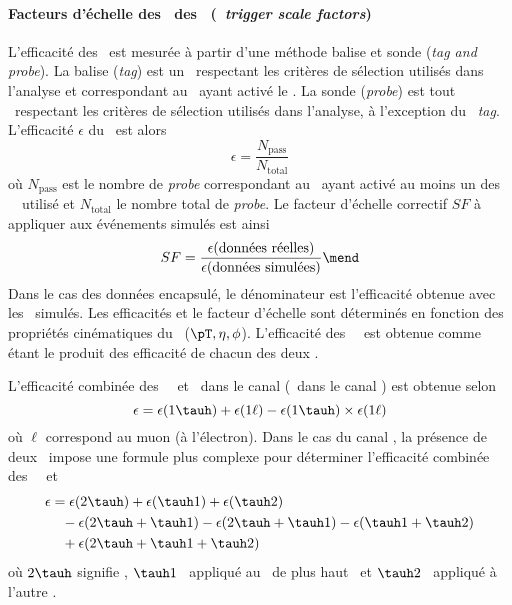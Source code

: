 \paragraph{Facteurs d'échelle des \HLTpaths\ des \tauh\ (\emph{\tauh\ trigger scale factors})}
L'efficacité des \HLTpaths\ est mesurée à partir d'une méthode \og balise et sonde \fg{}  (\emph{tag and probe}).
La balise (\emph{tag}) est un \tauh\ respectant les critères de sélection utilisés dans l'analyse et correspondant au \tauh\ ayant activé le \HLTpath.
La sonde (\emph{probe}) est tout \tauh\ respectant les critères de sélection utilisés dans l'analyse, à l'exception du \tauh\ \emph{tag}.
L'efficacité $\epsilon$ du \HLTpath\ est alors
\begin{equation}
\epsilon = \frac{N_\text{pass}}{N_\text{total}}
\end{equation}
où
$N_\text{pass}$ est le nombre de \emph{probe} correspondant au \tauh\ ayant activé au moins un des \HLTpaths\ \HLTSingleTau\ utilisé
et
$N_\text{total}$ le nombre total de \emph{probe}.
Le facteur d'échelle correctif $SF$ à appliquer aux événements simulés est ainsi
\begin{equation}
SF = \frac{\epsilon(\text{données réelles})}{\epsilon(\text{données simulées})}
\mend
\end{equation}
Dans le cas des données encapsulé, le dénominateur est l'efficacité obtenue avec les \tauh\ simulés.
Les efficacités et le facteur d'échelle sont déterminés en fonction des propriétés cinématiques du \tauh\ ($\pT, \eta, \phi$).
L'efficacité des \HLTpaths\ \HLTDoubleTau\ est obtenue comme étant le produit des efficacité de chacun des deux \tauh.
\par
L'efficacité combinée des \HLTpaths\ \HLTSingleTau\ et \HLTSingleMu\ dans le canal \mu\tauh (\HLTSingleEle\ dans le canal \ele\tauh) est obtenue selon
\begin{equation}
\epsilon = \epsilon(1\tauh) + \epsilon(1\ell) - \epsilon(1\tauh) \times \epsilon(1\ell)
\end{equation}
où $\ell$ correspond au muon (à l'électron).
Dans le cas du canal \tauh\tauh, la présence de deux \tauh\ impose une formule plus complexe pour déterminer l'efficacité combinée des \HLTpaths\ \HLTSingleTau\ et \HLTDoubleTau\,
\begin{align}
\epsilon &= \epsilon(2\tauh) + \epsilon(\tauh1) + \epsilon(\tauh2)
\nonumber\\ & \hphantom{=}
- \epsilon(2\tauh + \tauh1) - \epsilon(2\tauh + \tauh1) - \epsilon(\tauh1+\tauh2)
\nonumber\\ & \hphantom{=}
+ \epsilon(2\tauh + \tauh1 + \tauh2)
\end{align}
où $2\tauh$ signifie \HLTDoubleTau,
$\tauh1$ \HLTSingleTau\ appliqué au \tauh\ de plus haut \pT\ et
$\tauh2$ \HLTSingleTau\ appliqué à l'autre \tauh.
